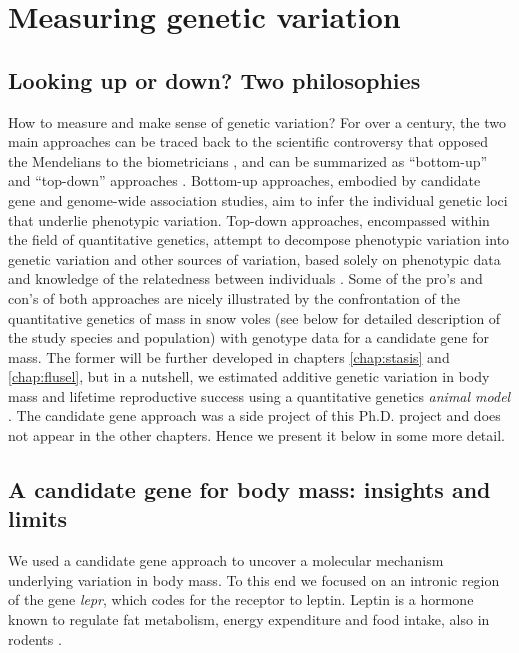 \section{Measuring genetic variation}
\subsection{Looking up or down? Two philosophies}
How to measure and make sense of genetic variation?
For over a century, the two main approaches can be traced back to the scientific controversy that opposed the Mendelians to the biometricians \parencite{Dietrich2006}, and can be summarized as ``bottom-up'' and ``top-down'' approaches \parencite{Liedvogel2012}. 
Bottom-up approaches, embodied by candidate gene and genome-wide association studies, aim to infer the individual genetic loci that underlie phenotypic variation.
Top-down approaches, encompassed within the field of quantitative genetics, attempt to decompose phenotypic variation into genetic variation and other sources of variation, based solely on phenotypic data and knowledge of the relatedness between individuals \parencite{Lynch1998}. 
Some of the pro's and con's of both approaches are nicely illustrated by the confrontation of the quantitative genetics of mass in snow voles (see below for detailed description of the study species and population) with genotype data for a candidate gene for mass. The former will be further developed in chapters \ref{chap:stasis} and \ref{chap:flusel}, but in a nutshell, we estimated additive genetic variation in body mass and lifetime reproductive success using a quantitative genetics \emph{animal model} \parencite{Henderson1950, Kruuk2004}. The candidate gene approach was a side project of this Ph.D. project and does not appear in the other chapters. Hence we present it below in some more detail.

\subsection{A candidate gene for body mass: insights and limits}
We used a candidate gene approach \parencite{Fitzpatrick2005} to uncover a molecular mechanism underlying variation in body mass. To this end we focused on an intronic region of the gene \emph{lepr}, which codes for the receptor to leptin. Leptin is a hormone known to regulate fat metabolism, energy expenditure and food intake, also in rodents \parencite{Houseknecht1998}.

